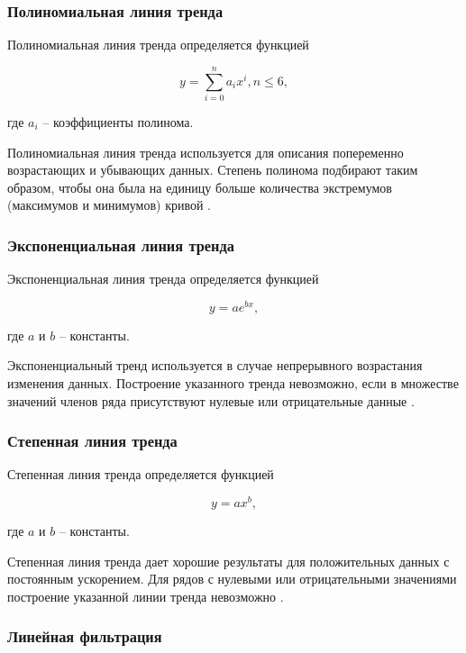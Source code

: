 \documentclass{bmstu}
\begin{document}
\subsubsection*{Полиномиальная линия тренда}

Полиномиальная линия тренда определяется функцией

\begin{equation}
	y = \sum_{i = 0}^{n} a_i x^i, n \leqslant 6,
\end{equation}

где $a_i$ -- коэффициенты полинома.

Полиномиальная линия тренда используется для описания попеременно возрастающих и убывающих данных. Степень полинома подбирают таким образом, чтобы она была на единицу больше количества экстремумов (максимумов и минимумов) кривой \cite{lt-exel}.

\subsubsection*{Экспоненциальная линия тренда}

Экспоненциальная линия тренда определяется функцией

\begin{equation}
	y = a e ^ {bx},
\end{equation}

где $a$ и $b$ -- константы.

Экспоненциальный тренд используется в случае непрерывного возрастания изменения данных. Построение указанного тренда не­возможно, если в множестве значений членов ряда присутствуют нулевые или отрицательные данные \cite{lt-exel}.

\subsubsection*{Степенная линия тренда}

Степенная линия тренда определяется функцией

\begin{equation}
	y = a x ^ b,
\end{equation}

где $a$ и $b$ -- константы.

Степенная линия тренда дает хорошие результаты для положительных данных с постоянным ускорением. Для рядов с нулевыми или отрицательными значениями построение указанной линии трен­да невозможно \cite{lt-exel}.

\subsubsection*{Линейная фильтрация}
\end{document}
